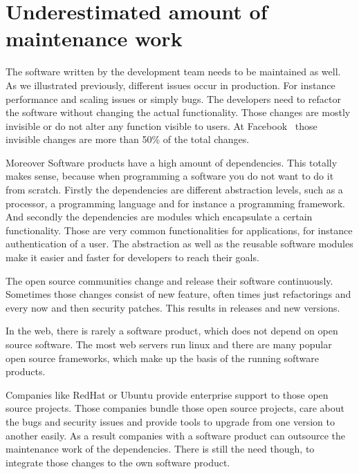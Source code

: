 \section{Underestimated amount of maintenance work}

The software written by the development team needs to be maintained as well. As we
illustrated previously, different issues occur in production. For instance performance and
scaling issues or simply bugs. The developers need to refactor the software without
changing the actual functionality. Those changes are mostly invisible or do not alter any
function visible to users. At Facebook~\cite{dev_at_fb} those invisible changes are more
than 50\% of the total changes.

Moreover Software products have a high amount of dependencies. This totally makes sense,
because when programming a software you do not want to do it from scratch. Firstly the
dependencies are different abstraction levels, such as a processor, a programming language
and for instance a programming framework. And secondly the dependencies are modules which
encapsulate a certain functionality. Those are very common functionalities for
applications, for instance authentication of a user. The abstraction as well as the
reusable software modules make it easier and faster for developers to reach their goals.

The open source communities change and release their software continuously. Sometimes
those changes consist of new feature, often times just refactorings and every now and then
security patches. This results in releases and new versions.

In the web, there is rarely a software product, which does not depend on open source
software. The most web servers run linux and there are many popular open source
frameworks, which make up the basis of the running software products.

Companies like RedHat or Ubuntu provide enterprise support to those open source
projects. Those companies bundle those open source projects, care about the bugs and
security issues and provide tools to upgrade from one version to another easily. As a
result companies with a software product can outsource the maintenance work of the
dependencies. There is still the need though, to integrate those changes to the own
software product.

